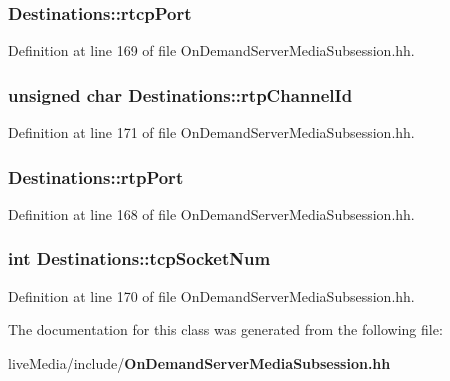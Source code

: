 \subsubsection[{rtcp\+Port}]{ Destinations\+::rtcp\+Port}\label{classDestinations_aa192ae86ec4a478c3d973c27b82d1ebb}


Definition at line 169 of file On\+Demand\+Server\+Media\+Subsession.\+hh.

\subsubsection[{rtp\+Channel\+Id}]{\setlength{\rightskip}{0pt plus 5cm}unsigned char Destinations\+::rtp\+Channel\+Id}\label{classDestinations_a2d403b96d803c0964fd34038227e6e32}


Definition at line 171 of file On\+Demand\+Server\+Media\+Subsession.\+hh.

\subsubsection[{rtp\+Port}]{ Destinations\+::rtp\+Port}\label{classDestinations_a44b8a5bcf00c56838356a6a790c4a665}


Definition at line 168 of file On\+Demand\+Server\+Media\+Subsession.\+hh.

\subsubsection[{tcp\+Socket\+Num}]{\setlength{\rightskip}{0pt plus 5cm}int Destinations\+::tcp\+Socket\+Num}\label{classDestinations_a67e647f007e964e0fb62802b92da1491}


Definition at line 170 of file On\+Demand\+Server\+Media\+Subsession.\+hh.



The documentation for this class was generated from the following file\+:\begin{DoxyCompactItemize}
\item 
live\+Media/include/{\bf On\+Demand\+Server\+Media\+Subsession.\+hh}\end{DoxyCompactItemize}
